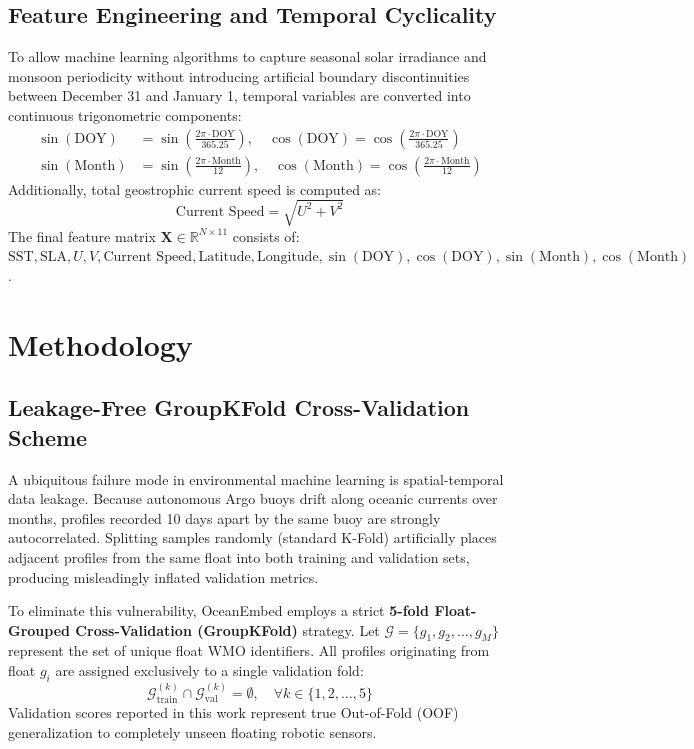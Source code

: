\documentclass[conference]{IEEEtran}
\begin{document}
\subsection{Feature Engineering and Temporal Cyclicality}
To allow machine learning algorithms to capture seasonal solar irradiance and monsoon periodicity without introducing artificial boundary discontinuities between December 31 and January 1, temporal variables are converted into continuous trigonometric components:
\begin{align}
\sin(\text{DOY}) &= \sin\left(\frac{2\pi \cdot \text{DOY}}{365.25}\right), \quad \cos(\text{DOY}) = \cos\left(\frac{2\pi \cdot \text{DOY}}{365.25}\right) \\
\sin(\text{Month}) &= \sin\left(\frac{2\pi \cdot \text{Month}}{12}\right), \quad \cos(\text{Month}) = \cos\left(\frac{2\pi \cdot \text{Month}}{12}\right)
\end{align}
Additionally, total geostrophic current speed is computed as:
\begin{equation}
\text{Current Speed} = \sqrt{U^2 + V^2}
\end{equation}
The final feature matrix $\mathbf{X} \in \mathbb{R}^{N \times 11}$ consists of: $\text{SST}, \text{SLA}, U, V, \text{Current Speed}, \text{Latitude}, \text{Longitude}, \sin(\text{DOY}), \cos(\text{DOY}), \sin(\text{Month}), \cos(\text{Month})$.

\section{Methodology}
\label{sec:methodology}

\subsection{Leakage-Free GroupKFold Cross-Validation Scheme}
A ubiquitous failure mode in environmental machine learning is spatial-temporal data leakage. Because autonomous Argo buoys drift along oceanic currents over months, profiles recorded 10 days apart by the same buoy are strongly autocorrelated. Splitting samples randomly (standard K-Fold) artificially places adjacent profiles from the same float into both training and validation sets, producing misleadingly inflated validation metrics.

To eliminate this vulnerability, OceanEmbed employs a strict \textbf{5-fold Float-Grouped Cross-Validation (GroupKFold)} strategy. Let $\mathcal{G} = \{g_1, g_2, \dots, g_M\}$ represent the set of unique float WMO identifiers. All profiles originating from float $g_i$ are assigned exclusively to a single validation fold:
\begin{equation}
\mathcal{G}_{\text{train}}^{(k)} \cap \mathcal{G}_{\text{val}}^{(k)} = \emptyset, \quad \forall k \in \{1, 2, \dots, 5\}
\end{equation}
Validation scores reported in this work represent true Out-of-Fold (OOF) generalization to completely unseen floating robotic sensors.
\end{document}
